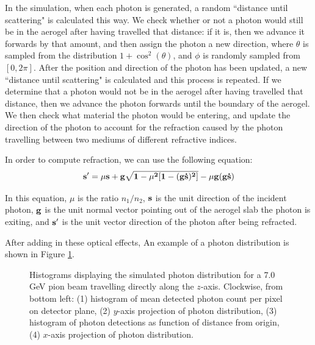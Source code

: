 In the simulation, when each photon is generated, a random ``distance until scattering" is calculated this way. 
We check whether or not a photon would still be in the aerogel after having travelled that distance: if it is, then we advance it forwards by that amount, and then assign the photon a new direction, where $\theta$ is sampled from the distribution $1 + \cos^2(\theta)$, and $\phi$ is randomly sampled from $[0, 2\pi]$.
After the position and direction of the photon has been updated, a new ``distance until scattering" is calculated and this process is repeated. 
If we determine that a photon would not be in the aerogel after having travelled that distance, then we advance the photon forwards until the boundary of the aerogel.
We then check what material the photon would be entering, and update the direction of the photon to account for the refraction caused by the photon travelling between two mediums of different refractive indices.

In order to compute refraction, we can use the following equation: 
\begin{equation}
\bf{s'} = \mu\bf{s} + \bf{g}\sqrt{1 - \mu^2[1-(\bf{g \dot s})^2]} - \mu \bf{g}(\bf{g \dot s})
\label{eq:refract}
\end{equation}

In this equation, $\mu$ is the ratio $n_1/n_2$, $\bf{s}$ is the unit direction of the incident photon, $\bf{g}$ is the unit normal vector pointing out of the aerogel slab the photon is exiting, and $\bf{s'}$ is the unit vector direction of the photon after being refracted.

After adding in these optical effects, An example of a photon distribution is shown in Figure \ref{fig:photonHist}.

\begin{figure}[]
\centering
{}
\caption[Example of simulated photon distribution for centered 7.0 GeV pion beam]{Histograms displaying the simulated photon distribution for a 7.0 GeV pion beam travelling directly along the $z$-axis. Clockwise, from bottom left: (1) histogram of mean detected photon count per pixel on detector plane, (2) $y$-axis projection of photon distribution, (3) histogram of photon detections as function of distance from origin, (4) $x$-axis projection of photon distribution. }
\label{fig:photonHist} 
\end{figure}


